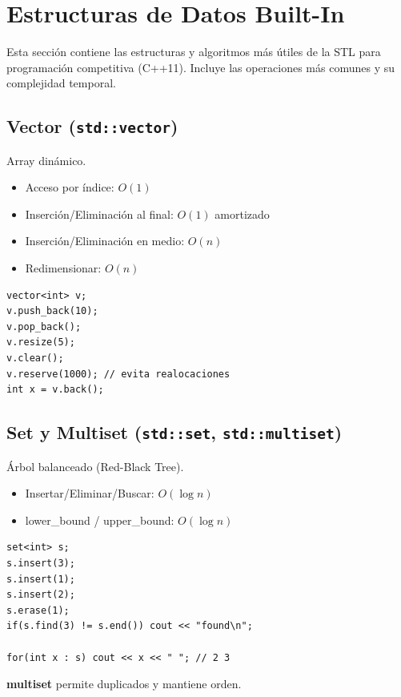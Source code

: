 \documentclass{article}
\begin{document}
\section{Estructuras de Datos Built-In}

Esta sección contiene las estructuras y algoritmos más útiles de la STL para programación competitiva (C++11).  
Incluye las operaciones más comunes y su complejidad temporal.

\subsection{Vector (\texttt{std::vector})}

Array dinámico.

\begin{itemize}
  \item Acceso por índice: \(O(1)\)
  \item Inserción/Eliminación al final: \(O(1)\) amortizado
  \item Inserción/Eliminación en medio: \(O(n)\)
  \item Redimensionar: \(O(n)\)
\end{itemize}

\begin{lstlisting}[style=cppstyle]
vector<int> v;
v.push_back(10);
v.pop_back();
v.resize(5);
v.clear();
v.reserve(1000); // evita realocaciones
int x = v.back();
\end{lstlisting}


\subsection{Set y Multiset (\texttt{std::set}, \texttt{std::multiset})}

Árbol balanceado (Red-Black Tree).

\begin{itemize}
  \item Insertar/Eliminar/Buscar: \(O(\log n)\)
  \item lower\_bound / upper\_bound: \(O(\log n)\)
\end{itemize}

\begin{lstlisting}[style=cppstyle]
set<int> s;
s.insert(3);
s.insert(1);
s.insert(2);
s.erase(1);
if(s.find(3) != s.end()) cout << "found\n";

for(int x : s) cout << x << " "; // 2 3
\end{lstlisting}

\textbf{multiset} permite duplicados y mantiene orden.
\end{document}

